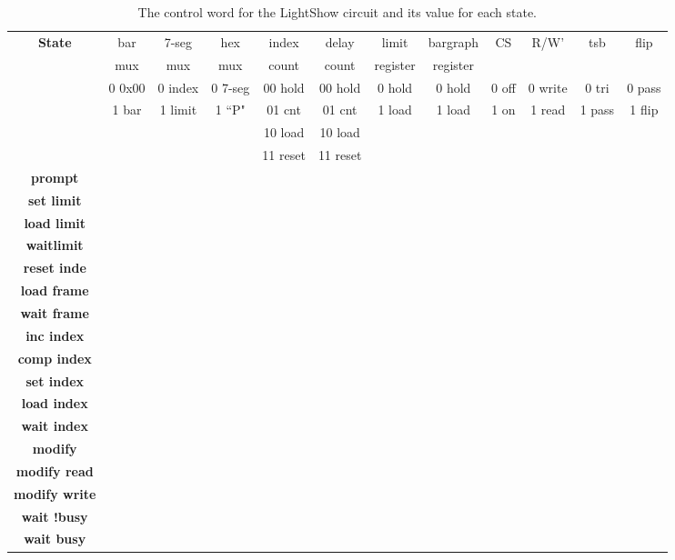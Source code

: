 \begin{description}
\begin{landscape}
\begin{table}
{\small
\begin{tabular}{c||c|c|c|c|c|c|c|c|c|c|c}
\textbf{ State } 	& bar & 7-seg & hex & index & delay & limit    & bargraph & CS & R/W' & tsb & flip \\  
	& mux & mux   & mux & count & count & register & register &       &       & &      \\  \hline \hline
	& 0 0x00 & 0 index & 0 7-seg & 00 hold & 00 hold & 0 hold & 0 hold & 0 off & 0 write & 0 tri & 0 pass \\ 
	& 1 bar	& 1 limit & 1 ``P"& 01 cnt & 01 cnt & 1 load &    1 load & 1 on    &  1 read & 1 pass & 1 flip \\
	& 	&     &     & 10 load & 10 load & & & & & \\
	& 	&     &	    & 11 reset	& 11 reset & & & & \\ \hline \hline
\textbf{ prompt } 	 & 	  &	  &	  &	   &	   &	  &	  &	  &   &	  &   \\ \hline
\textbf{ set limit }  & 	  &	  &	  &	   &	   &	  &	  &	  &   &	  &   \\ \hline
\textbf{ load limit } &	  &	  &	  &	   &	   &	  &	  &	  &   &	  &   \\ \hline
\textbf{ waitlimit } &	  &	  &	  &	   &	   &	  &	  &	  &   &	  &   \\ \hline
\textbf{ reset inde  } &	  &	  & 	  &	   &	   &	  &	  &	  &   &	  &   \\ \hline
\textbf{ load frame } &	  &	  &	  &	   &	   &	  &	  &	  &   &   &   \\ \hline
\textbf{ wait frame } &	  &	  &	  &	   &	   &	  &	  &	  &   &	  &   \\ \hline
\textbf{ inc index } &	  &	  &	  &	   &	   &	  &	  &	  &   &	  &   \\ \hline
\textbf{ comp index } &	  &	  &	  &	   &	   &	  &	  &	  &   &	  &   \\ \hline
\textbf{ set index } &	  &	  &	  &	   & 	   &	  & 	  &	  &   &	  &   \\ \hline
\textbf{ load index } &	  &	  & 	  &	   &	   &	  &	  &	  &   &   &   \\ \hline
\textbf{ wait index } &	  &	  &	  &	   &	   &	  &	  &	  &   &	  &   \\ \hline
\textbf{ modify	} &	  &	  &	  &	   &	   &	  &	  &	  &   &	  &   \\ \hline
\textbf{ modify read} &	  &	  &	  &	   &	   &	  &	  &	  &   &	  &   \\ \hline
\textbf{ modify write } &	  &	  &	  &	   &	   &	  &	  & 	  &   &	  &   \\ \hline
\textbf{ wait !busy } &	  &	  &	  &	   &	   &	  &	  &	  &   &	  &   \\ \hline
\textbf{ wait busy } &	  &	  &	  &	   &	   &	  &	  &	  &   &	  &   \\ 
\end{tabular} 
}
\caption{The control word for the LightShow circuit and its value for each state.}
\label{table:LightShow}
\end{table}

\end{landscape}


\end{description}
